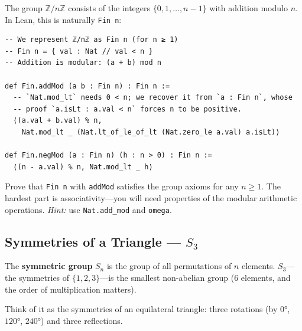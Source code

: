 \documentclass[11pt, a4paper, oneside]{book}
\newcommand{\Z}{\mathbb{Z}}
\newcommand{\lc}[1]{\texttt{#1}}
\newcounter{exercise}[chapter]
\begin{document}
The group $\Z/n\Z$ consists of the integers $\{0, 1, \ldots, n-1\}$ with
addition modulo $n$. In Lean, this is naturally \lc{Fin n}:

\begin{leanbox}
\begin{verbatim}
-- We represent ℤ/nℤ as Fin n (for n ≥ 1)
-- Fin n = { val : Nat // val < n }
-- Addition is modular: (a + b) mod n

def Fin.addMod (a b : Fin n) : Fin n :=
  -- `Nat.mod_lt` needs 0 < n; we recover it from `a : Fin n`, whose
  -- proof `a.isLt : a.val < n` forces n to be positive.
  ⟨(a.val + b.val) % n,
    Nat.mod_lt _ (Nat.lt_of_le_of_lt (Nat.zero_le a.val) a.isLt)⟩

def Fin.negMod (a : Fin n) (h : n > 0) : Fin n :=
  ⟨(n - a.val) % n, Nat.mod_lt _ h⟩
\end{verbatim}
\end{leanbox}

\begin{exercisebox}[title={Exercise 1.1}]
Prove that \lc{Fin n} with \lc{addMod} satisfies the group axioms for any
$n \geq 1$. The hardest part is associativity---you will need properties of
the modular arithmetic operations. \emph{Hint:} use \lc{Nat.add\_mod} and
\lc{omega}.
\end{exercisebox}

\subsection{Symmetries of a Triangle --- $S_3$}

The \textbf{symmetric group} $S_n$ is the group of all permutations of
$n$ elements. $S_3$---the symmetries of $\{1, 2, 3\}$---is the smallest
non-abelian group (6 elements, and the order of multiplication matters).

Think of it as the symmetries of an equilateral triangle: three rotations
(by $0°$, $120°$, $240°$) and three reflections.

\begin{center}
\hspace{2cm}
\end{center}
\end{document}
